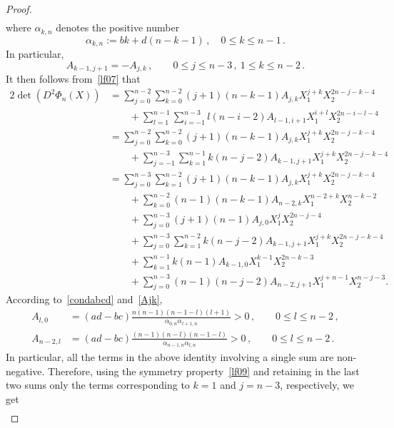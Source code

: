 \documentclass[10pt]{amsart}
\theoremstyle{definition}\newtheorem{defi}[theo]{Definition}\newtheorem{rema}[theo]{Remark}\newtheorem{exam}[theo]{Example}\newtheorem{exem}[theo]{Example}\newtheorem{nota}[theo]{Notation}
\begin{document}
\begin{proof}
\begin{multline}
\end{multline}
where $\alpha_{k,n}$ denotes the positive number
\begin{equation*}
\alpha_{k,n}:=bk+d(n-k-1)\,,\quad 0\leq k\leq n-1\,.
\end{equation*}
In particular,
\begin{equation}\label{lf09}
A_{k-1,j+1} = - A_{j,k}\,, \qquad 0\le j\le n-3\,, \ 1\le k\le n-2\,. 
\end{equation}
It then follows from~\eqref{lf07} that
\begingroup
\allowdisplaybreaks
\begin{align*}
2 \det(D^2\Phi_n(X))& = \sum_{j=0}^{n-2} \sum_{k=0}^{n-2} (j+1)(n-k-1) A_{j,k} X_1^{j+k} X_2^{2n-j-k-4} \\
& \qquad + \sum_{l=1}^{n-1} \sum_{i=-1}^{n-3} l(n-i-2) A_{l-1,i+1} X_1^{i+l} X_2^{2n-i-l-4} \\
& = \sum_{j=0}^{n-2} \sum_{k=0}^{n-2} (j+1)(n-k-1) A_{j,k} X_1^{j+k} X_2^{2n-j-k-4} \\
& \qquad + \sum_{j=-1}^{n-3} \sum_{k=1}^{n-1} k(n-j-2) A_{k-1,j+1} X_1^{j+k} X_2^{2n-j-k-4}\\
& = \sum_{j=0}^{n-3} \sum_{k=1}^{n-2} (j+1)(n-k-1) A_{j,k} X_1^{j+k} X_2^{2n-j-k-4} \\
& \qquad + \sum_{k=0}^{n-2} (n-1)(n-k-1) A_{n-2,k} X_1^{n-2+k} X_2^{n-k-2} \\
& \qquad + \sum_{j=0}^{n-3} (j+1)(n-1) A_{j,0} X_1^{j} X_2^{2n-j-4} \\
& \qquad + \sum_{j=0}^{n-3} \sum_{k=1}^{n-2} k(n-j-2) A_{k-1,j+1} X_1^{j+k} X_2^{2n-j-k-4} \\
& \qquad + \sum_{k=1}^{n-1} k(n-1) A_{k-1,0} X_1^{k-1} X_2^{2n-k-3} \\
& \qquad + \sum_{j=0}^{n-3} (n-1)(n-j-2) A_{n-2,j+1} X_1^{j+n-1} X_2^{n-j-3}.
\end{align*}
\endgroup
According to~\eqref{condabcd} and~\eqref{Ajk},
\begin{align*}
A_{l,0} & = (ad-bc) \frac{n(n-1)(n-1-l)(l+1)}{\alpha_{0,n}\alpha_{l+1,n}}>0\,, \qquad 0\le l\le n-2\,,\\
A_{n-2,l} & = (ad-bc) \frac{(n-1)(n-l)(n-1-l)}{\alpha_{n-1,n}\alpha_{l,n}}>0\,, \qquad 0\le l\le n-2\,.
\end{align*}
In particular, all the terms in the above identity involving a single sum are non-negative. Therefore, using the symmetry property~\eqref{lf09} and retaining in the last two sums only the terms corresponding to $k=1$ and $j=n-3$, respectively, we get
\begin{align*}

\end{align*}
\end{proof}
\end{document}
